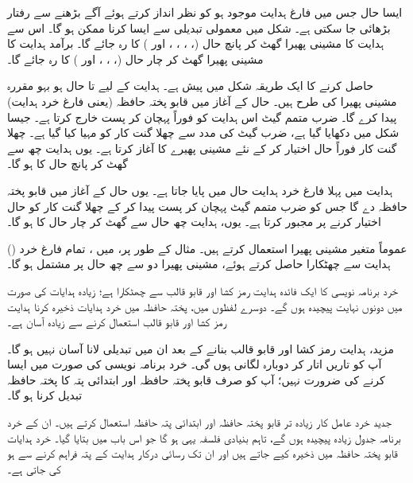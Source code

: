 ایسا  حال جس میں فارغ  ہدایت موجود ہو کو  نظر انداز کرتے ہوئے آگے بڑھنے  سے رفتار بڑھائی جا سکتی ہے۔ شکل  میں معمولی تبدیلی سے ایسا کرنا ممکن ہو گا۔ اس سے  ہدایت کا  مشینی پھیرا  گھٹ کر پانچ  حال  (، ، ، ، اور ) کا رہ جائے گا۔ برآمد ہدایت کا مشینی پھیرا گھٹ کر چار  حال   (، ، ، اور  ) کا رہ جائے گا۔

 حاصل کرنے کا ایک طریقہ شکل   میں  پیش ہے۔   ہدایت کے لیے  تا  حال  ہو بہو مقررہ مشینی پھیرا کی طرح ہیں۔   حال  کے آغاز  میں  قابو پختہ حافظہ  (یعنی فارغ خرد ہدایت)  پیدا کرے گا۔ ضرب متمم گیٹ اس ہدایت کو فوراً پہچان کر  پست   خارج کرتا ہے۔ جیسا شکل  میں دکھایا گیا ہے،  ضرب گیٹ کی مدد سے   چھلا گنت کار کو مہیا کیا گیا ہے۔ چھلا گنت کار فوراً  حال  اختیار کر کے  نئے مشینی پھیرے کا آغاز کرتا ہے۔ یوں  ہدایت چھ   سے  گھٹ کر پانچ حال   کا ہو گا۔

 ہدایت میں پہلا فارغ خرد ہدایت  حال میں پایا جاتا ہے۔ یوں  حال کے آغاز میں  قابو پختہ حافظہ  دے گا جس کو ضرب متمم گیٹ پہچان کر پست   پیدا کر  کے چھلا گنت کار کو  حال اختیار کرنے پر مجبور کرتا ہے۔ یوں،  ہدایت  چھ حال سے گھٹ کر چار حال کا ہو گا۔

() عموماً متغیر مشینی پھیرا  استعمال کرتے ہیں۔ مثال کے طور پر،  میں ، تمام فارغ خرد ہدایت سے چھٹکارا حاصل کرتے ہوئے،  مشینی پھیرا  دو سے چھ  حال پر مشتمل ہو  گا۔

خرد برنامہ نویسی کا ایک فائدہ  ہدایت رمز کشا اور قابو قالب سے چھٹکارا ہے؛ زیادہ ہدایات کی صورت میں دونوں نہایت پیچیدہ ہوں گے۔ دوسرے لفظوں میں، پختہ حافظہ میں  خرد ہدایات ذخیرہ کرنا ہدایت رمز کشا اور قابو قالب استعمال کرنے سے  زیادہ آسان ہے۔

مزید، ہدایت رمز کشا اور قابو قالب بنانے کے بعد ان میں تبدیلی لانا  آسان نہیں ہو گا۔ آپ کو  تاریں اتار کر دوبارہ لگانی ہوں گی۔ خرد برنامہ نویسی کی صورت میں ایسا کرنے کی ضرورت نہیں؛ آپ کو صرف قابو پختہ حافظہ  اور ابتدائی پتہ کا پختہ حافظہ تبدیل کرنا ہو گا۔

 جدید  خرد عامل کار  زیادہ تر قابو  پختہ   حافظہ اور ابتدائی پتہ حافظہ   استعمال کرتے ہیں۔ ان کے خرد برنامہ جدول زیادہ پیچیدہ ہوں گے، تاہم بنیادی فلسفہ یہی ہو گا جو اس باب میں بتایا گیا۔ خرد ہدایات قابو پختہ حافظہ میں ذخیرہ  کیے جاتے ہیں اور ان تک رسائی درکار ہدایت کے پتہ فراہم کرنے سے  ہو کی جاتی ہے۔
 

